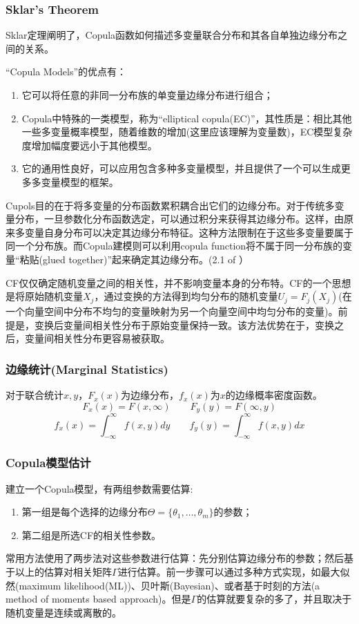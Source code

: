 \subsubsection{Sklar's Theorem}
Sklar定理阐明了，Copula函数如何描述多变量联合分布和其各自单独边缘分布之间的关系。


``Copula Models''的优点有\cite{Smith2009}：
\begin{enumerate}
    \item 它可以将任意的非同一分布族的单变量边缘分布进行组合；
    \item Copula中特殊的一类模型，称为``elliptical copula(EC)''，其性质是：相比其他一些多变量概率模型，随着维数的增加(这里应该理解为变量数)，EC模型复杂度增加幅度要远小于其他模型。
    \item 它的通用性良好，可以应用包含多种多变量模型，并且提供了一个可以生成更多多变量模型的框架。
\end{enumerate}

\textcolor[rgb]{1,0,0}{Cupols目的在于将多变量的分布函数累积耦合出它们的边缘分布。对于传统多变量分布，一旦参数化分布函数选定，可以通过积分来获得其边缘分布。这样，由原来多变量自身分布可以决定其边缘分布特征。这种方法限制在于这些多变量要属于同一个分布族。而Copula建模则可以利用copula function将不属于同一分布族的变量``粘贴(glued together)''起来确定其边缘分布。(2.1 of \cite{Smith2009}}）



CF仅仅确定随机变量之间的相关性，并不影响变量本身的分布特。CF的一个思想是将原始随机变量$X_j$，通过变换的方法得到均匀分布的随机变量$U_j = F_j(X_j)$(在一个向量空间中分布不均匀的变量映射为另一个向量空间中均匀分布的变量)。前提是，变换后变量间相关性分布于原始变量保持一致。该方法优势在于，变换之后，变量间相关性分布更容易被获取。
\subsubsection{边缘统计(Marginal Statistics)}
对于联合统计$x,y$，$F_x(x)$为边缘分布，$f_x(x)$为$x$的边缘概率密度函数。
\begin{equation}
    F_x(x) = F(x,\infty) \qquad F_y(y) = F(\infty,y)
    \label{eq0.1}
\end{equation}
\begin{equation}
    f_x(x) = \int_{-\infty}^{\infty} f(x,y) dy \qquad f_y(y) = \int_{-\infty}^{\infty} f(x,y) dx
    \label{eq0.2}
\end{equation}
\subsubsection{Copula模型估计}
建立一个Copula模型，有两组参数需要估算\cite{Smith2009}:
\begin{enumerate}
    \item 第一组是每个选择的边缘分布$\Theta = \{\theta_1,\dots,\theta_m\}$的参数；
    \item 第二组是所选CF的相关性参数。
\end{enumerate}
常用方法使用了两步法对这些参数进行估算：先分别估算边缘分布的参数；然后基于以上的估算对相关矩阵$\Gamma$进行估算。前一步骤可以通过多种方式实现，如最大似然(maximum likelihood(ML))、贝叶斯(Bayesian)、或者基于时刻的方法(a method of moments based approach)。但是$\Gamma$的估算就要复杂的多了，并且取决于随机变量是连续或离散的。

